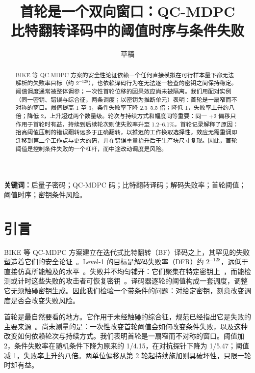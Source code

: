 \documentclass[UTF8,a4paper,10pt,twocolumn]{ctexart}
\title{\vspace{-1.2em}\heiti\zihao{3} 首轮是一个双向窗口：QC-MDPC\\比特翻转译码中的阈值时序与条件失败}
\author{\zihao{5} 草稿}
\date{}
\begin{document}
\maketitle

\begin{abstract}
BIKE 等 QC-MDPC 方案的安全性论证依赖一个任何直接模拟在可行样本量下都无法解析的失败率目标（约 $2^{-128}$），也依赖译码行为在无法逐一检查的密钥之间保持稳定。阈值调度通常被整体调参；一次性首轮位移的因果效应尚未被隔离。我们用配对实例（同一密钥、错误与综合征，两条调度；以密钥为推断单元）表明：首轮是一扇窄而不对称的窗口。阈值提高 1 至 3，条件失败率下降 2.3--5.5 倍；降低 1，失败率上升约八倍；降低 2，上升超过两个数量级。轮次与持续方式和幅度同等重要：同一 $+2$ 偏移只作用于首轮时有益，持续到后续轮次则使失败率升至 1.2--6.1\%。首轮记录解释了原因：抬高阈值压制的错误翻转远多于正确翻转，以推迟的工作换取选择性。效应无需重调即迁移到第二个工作点与更大的码，并在错误重量抬升后于生产块尺寸复现。因此，首轮阈值是控制条件失败的一个杠杆，而中途改动调度是风险。
\end{abstract}

\vspace{0.6em}

\noindent\textbf{关键词：}后量子密码；QC-MDPC 码；比特翻转译码；解码失败率；首轮阈值；阈值时序；密钥条件风险。

\vspace{0.8em}

\section{引言}\label{sec:intro}

BIKE 等 QC-MDPC 方案建立在迭代式比特翻转（BF）译码之上，其罕见的失败塑造着它们的安全论证~\cite{misoczki2013mdpc,bike2024spec,alagic2025nist}。Level-1 的目标是解码失败率（DFR）约 $2^{-128}$，远低于直接仿真所能触及的水平~\cite{sendrier2019dfr,vasseur2021thesis}。失败并不均匀铺开：它们聚集在特定密钥上~\cite{guo2016key,wang2023weak,nosouhi2023weakkey}，而能检测或计时这些失败的攻击者可恢复密钥~\cite{eaton2018timing}。译码器逐轮的阈值构成一套调度，调整它无须触碰密钥生成。因此我们检验一个带条件的问题：对给定密钥，刻意改变调度是否会改变失败风险。

首轮是最自然要看的地方。它作用于未经触碰的综合征，规范已经指出它是失败的主要来源~\cite{bike2024spec}。尚未测量的是：一次性改变首轮阈值会如何改变条件失败，以及这种改变如何依赖轮次与持续方式。我们表明首轮是一扇窄而不对称的窗口。阈值加 2，条件失败率在随机条件下降为原来的 1/4.15，在对抗探针下降为 1/5.47；阈值减 1，失败率上升约八倍。两单位偏移从第 2 轮起持续施加则具破坏性，只限一轮时却有益。
\end{document}
